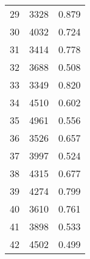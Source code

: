 \documentclass[11pt]{article}
\begin{document}
\begin{tabular}{ |p{3cm}||p{3cm}|p{3cm}|  }
 29      & 3328    & 0.879       \\
 30      & 4032 & 0.724       \\
 31      & 3414   & 0.778        \\
 32      & 3688 & 0.508       \\
 33      & 3349    & 0.820       \\
 34      & 4510    & 0.602       \\
 35      & 4961 & 0.556       \\
 36      & 3526   & 0.657        \\
 37      & 3997 & 0.524       \\
 38      & 4315    & 0.677       \\
 39      & 4274    & 0.799       \\
 40      & 3610 & 0.761       \\
 41      & 3898    & 0.533       \\
 42      & 4502 & 0.499      \\
 \hline
\end{tabular}
\end{document}
